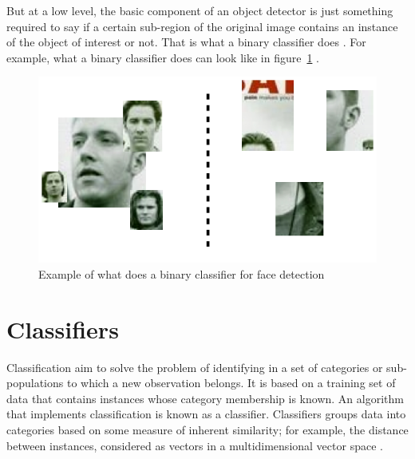 \noindent But at a low level, the basic component of an object detector is just something required to say if a certain sub-region of the original image contains an instance of the object of interest or not. That is what a binary classifier does \cite{DIN08}. For example, what a binary classifier does can look like in figure~\ref{output_example_face_detection_binary_classifier} \cite{DIN08}.
\newline

\begin{figure}[!h]
\begin{center}
\noindent \includegraphics[scale=0.5]{figures/output_example_face_detection_binary_classifier} 
\newline
\caption{Example of what does a binary classifier for face detection}
\label{output_example_face_detection_binary_classifier}
\end{center} 
\end{figure}

\section{Classifiers}

\noindent Classification aim to solve the problem of identifying in a set of categories or sub-populations to which a new observation belongs. It is based on a training set of data that contains instances whose category membership is known. An algorithm that implements classification is known as a classifier. Classifiers groups data into categories based on some measure of inherent similarity; for example, the distance between instances, considered as vectors in a multidimensional vector space \cite{CLASS}.
\newline









